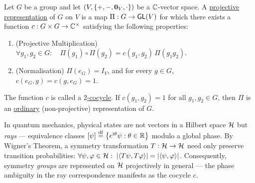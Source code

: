 \documentclass[11pt,reqno]{amsart}
\renewcommand{\phi}{\varphi}
\newcommand{\ii}{\mathrm{i}}
\begin{document}
\begin{Def}\label{def:projective-rep}
Let $G$ be a group and let $\Br{V,\set{+,-,\bm0_V,\cdot}}$ be a
$\mathbb{C}$-vector space.
A \ul{projective representation} of $G$ on $V$ is a map
$\Pi:G\to\operatorname{\mathsf{GL}}(V)$ for which there exists a function
$c:G\times G\to\mathbb{C}^\times$ satisfying the following properties:
\begin{enumerate}
\item (Projective Multiplication)
$\forall g_1,g_2\in G:\quad
\Pi(g_1)\circ\Pi(g_2)=c(g_1,g_2)\,\Pi(g_1g_2)$.
\item (Normalisation)
$\Pi(e_G)=I_V$, and for every $g\in G$,
$c(e_G,g)=c(g,e_G)=1$.
\end{enumerate}
The function $c$ is called a \ul{$2$-cocycle}.
If $c(g_1,g_2)=1$ for all $g_1,g_2\in G$, then $\Pi$ is an
\ul{ordinary} (non-projective) representation of $G$.
\end{Def}

\begin{remark}
In quantum mechanics, physical states are not vectors in a Hilbert
space $\mathcal{H}$ but \emph{rays} — equivalence classes
$\SqBr{\psi}\df\set{e^{\ii\theta}\psi:\theta\in\R}$ modulo a global
phase.
By Wigner's Theorem, a symmetry transformation
$T:\mathcal{H}\to\mathcal{H}$ need only preserve transition probabilities:
$\forall\psi,\phi\in\H:\;
\abs{\Inner{T\psi}{T\phi}}=\abs{\Inner{\psi}{\phi}}$.
Consequently, symmetry \emph{groups} are represented on $\mathcal{H}$
projectively in general — the phase ambiguity in the ray
correspondence manifests as the cocycle $c$.
\end{remark}
\end{document}
